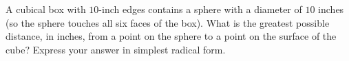 A cubical box with $10$-inch edges contains a sphere with a diameter of $10$ inches (so the sphere touches all six faces of the box). What is the greatest possible distance, in inches, from a point on the sphere to a point on the surface of the cube? Express your answer in simplest radical form.
